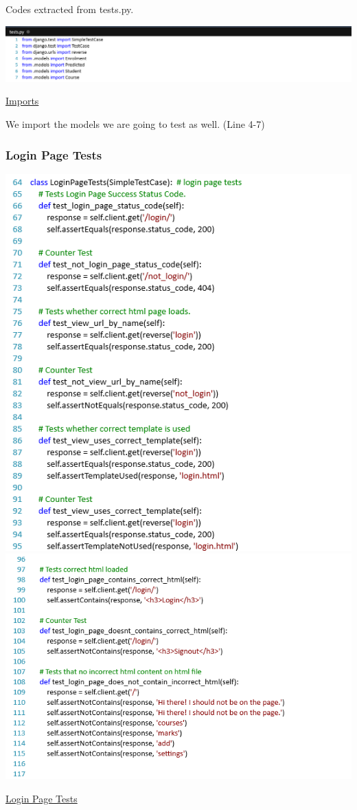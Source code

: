 \documentclass[10pt]{article}
\begin{document}
Codes extracted from tests.py.

\begin{center}
\includegraphics[width=.9\textwidth]{imports.png}
\end{center}
\caption{\underline{Imports}}
We import the models we are going to test as well. (Line 4-7)

\subsubsection{Login Page Tests}

\begin{center}
\includegraphics[width=.9\textwidth]{page_test1.png}
\includegraphics[width=.9\textwidth]{page_test2.png}
\end{center}
\caption{\underline{Login Page Tests}}
\end{document}
